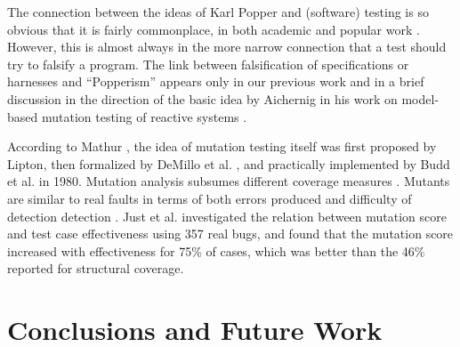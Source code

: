 \documentclass{svjour3}
\begin{document}
The connection between the ideas of Karl Popper and (software) testing
is so obvious that it is fairly commonplace, in both academic and
popular work \cite{kaner}.  However, this is almost always in the more
narrow connection that a test should try to falsify a program.  The
link between falsification of specifications or harnesses and
``Popperism'' appears only in our previous work \cite{ase15} and in a
brief discussion in the direction
of the basic idea by Aichernig in his work on model-based mutation testing
of reactive systems \cite{aichernig2013model}.

According to Mathur \cite{mathur2012foundations}, the idea of mutation
testing itself was first proposed by 
Lipton, then formalized by DeMillo et
al. \cite{PracProg}, and practically implemented by
Budd et al. \cite{budd1980theoretical} in 1980.
Mutation analysis subsumes different coverage
measures \cite{budd1980mutation,mathur1994empirical,offutt1996subsumption}.
Mutants are
similar to real faults in terms of both errors
produced \cite{daran1996software} and difficulty of detection
detection \cite{mutant,andrews2006using}. Just et
al. \cite{justmutants} investigated the relation between mutation
score and test case effectiveness using 357 real bugs, and found that
the mutation score increased with effectiveness for 75\% of cases,
which was better than the 46\% reported for structural coverage.

\section{Conclusions and Future Work}
\end{document}
